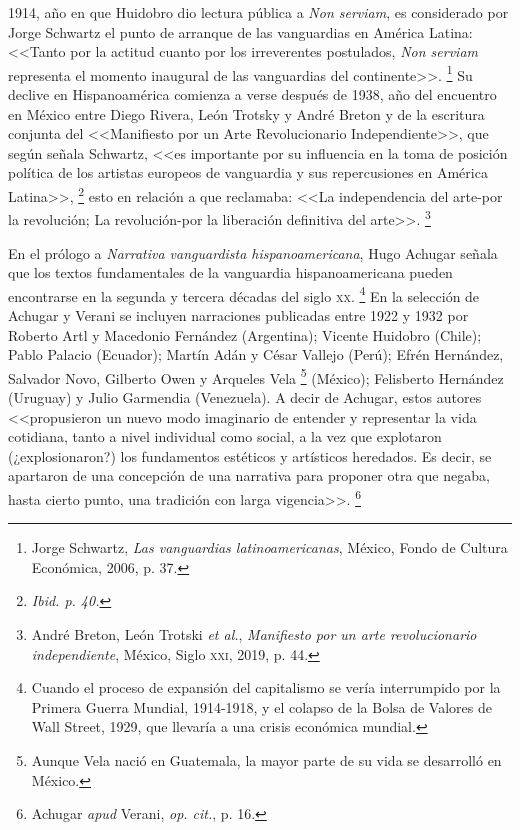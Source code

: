 \documentclass[14pt,twoside,final]{extbook} %
\let\oldfootnote\footnote
\renewcommand\footnote[1]{%
\oldfootnote{\hspace{1mm}#1}}
\begin{document}
1914, año en que Huidobro dio lectura pública a \emph{Non serviam}, es considerado
por Jorge Schwartz el punto de arranque de las vanguardias en América Latina: <<Tanto por la actitud cuanto por los irreverentes postulados, \emph{Non serviam} representa el momento inaugural de las vanguardias del continente>>.\footnote{Jorge Schwartz, \emph{Las vanguardias latinoamericanas}, México, Fondo de Cultura Económica, 2006, p. 37.} Su declive en Hispanoamérica comienza a verse después de 1938, año del encuentro en México entre Diego Rivera, León Trotsky y André Breton y de la escritura conjunta del <<Manifiesto por un Arte Revolucionario Independiente>>, que según señala Schwartz, <<es importante por su influencia en la toma de posición política de los artistas europeos de vanguardia y sus repercusiones en América Latina>>,\footnote{\em Ibid. p. 40.} esto en relación a que reclamaba: <<La independencia del arte-por la revolución; La revolución-por la liberación definitiva del arte>>.\footnote{André Breton, León Trotski \emph{et al.}, \emph{Manifiesto por un arte revolucionario independiente}, México, Siglo \textsc{xxi}, 2019, p. 44.}

En el prólogo a \emph{Narrativa vanguardista hispanoamericana}, Hugo Achugar señala que los textos fundamentales de la vanguardia hispanoamericana pueden encontrarse en la segunda y tercera décadas del siglo \textsc{xx}.\footnote{Cuando el proceso de expansión del capitalismo se vería interrumpido por la Primera Guerra Mundial, 1914-1918, y el colapso de la Bolsa de Valores de Wall Street, 1929, que llevaría a una crisis económica mundial.} En la selección de Achugar y Verani se incluyen narraciones publicadas entre 1922 y 1932 por Roberto Artl y Macedonio Fernández (Argentina); Vicente Huidobro (Chile); Pablo Palacio (Ecuador); Martín Adán y César Vallejo (Perú); Efrén Hernández, Salvador Novo, Gilberto Owen y Arqueles Vela\footnote{Aunque Vela nació en Guatemala, la mayor parte de su vida se desarrolló en México.} (México); Felisberto Hernández (Uruguay) y Julio Garmendia (Venezuela). A decir de Achugar, estos autores <<propusieron un nuevo modo imaginario de entender y representar la vida cotidiana, tanto a nivel individual como social, a la vez que explotaron (¿explosionaron?) los fundamentos estéticos y artísticos heredados. Es decir, se apartaron de una concepción de una narrativa para proponer otra que negaba, hasta cierto punto, una tradición con larga vigencia>>.\footnote{Achugar \emph{apud} Verani, \emph{op. cit.}, p. 16.}
\end{document}
